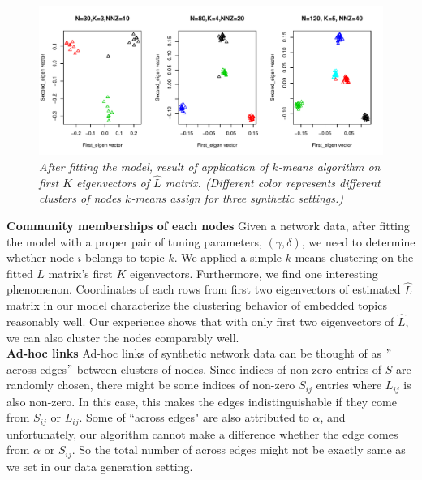 \documentclass[AMS,STIX1COL]{WileyNJD-v2}
\begin{document}
\begin{figure}[h]
\includegraphics[width=1\textwidth]{Fig1.pdf}
\caption{\it After fitting the model, result of application of $k$-means algorithm on first $K$ eigenvectors of $\hat{L}$ matrix. (Different color represents different clusters of nodes $k$-means assign for three synthetic settings.) }
\label{fig:figure1}
\end{figure}


\noindent \textbf{Community memberships of each nodes} Given a network data, after fitting the model with a proper pair of tuning parameters, $(\gamma,\delta)$, we need to determine whether node $i$ belongs to topic $k$. 
We applied a simple $k$-means clustering on the fitted $L$ matrix's first $K$ eigenvectors. 
Furthermore, we find one interesting phenomenon. 
Coordinates of each rows from first two eigenvectors of estimated $\hat{L}$ matrix in our model characterize the clustering behavior of embedded topics reasonably well. 
Our experience shows that with only first two eigenvectors of $\hat{L}$, we can also cluster the nodes comparably well. \\

\noindent \textbf{Ad-hoc links} Ad-hoc links of synthetic network data can be thought of as $"$across edges$"$ between clusters of nodes. 
Since indices of non-zero entries of $S$ are randomly chosen, there might be some indices of non-zero $S_{ij}$ entries where $L_{ij}$ is also non-zero. 
In this case, this makes the edges indistinguishable if they come from $S_{ij}$ or $L_{ij}$. 
Some of ``across edges" are also attributed to $\alpha$, and unfortunately, our algorithm cannot make a difference whether the edge comes from $\alpha$ or $S_{ij}$. 
So the total number of across edges might not be exactly same as we set in our data generation setting. \\
\end{document}
